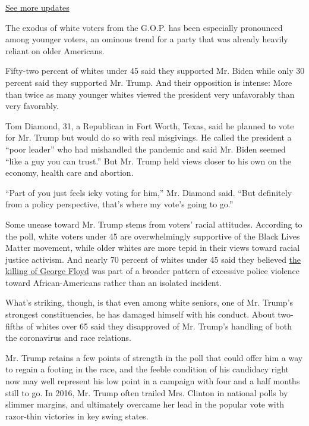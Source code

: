 \href{https://www.nytimes.com/2020/08/03/us/elections/biden-vs-trump.html?action=click\&pgtype=Article\&state=default\&region=MAIN_CONTENT_1\&context=storylines_live_updates}{See
more updates}

The exodus of white voters from the G.O.P. has been especially
pronounced among younger voters, an ominous trend for a party that was
already heavily reliant on older Americans.

Fifty-two percent of whites under 45 said they supported Mr. Biden while
only 30 percent said they supported Mr. Trump. And their opposition is
intense: More than twice as many younger whites viewed the president
very unfavorably than very favorably.

Tom Diamond, 31, a Republican in Fort Worth, Texas, said he planned to
vote for Mr. Trump but would do so with real misgivings. He called the
president a ``poor leader'' who had mishandled the pandemic and said Mr.
Biden seemed ``like a guy you can trust.'' But Mr. Trump held views
closer to his own on the economy, health care and abortion.

``Part of you just feels icky voting for him,'' Mr. Diamond said. ``But
definitely from a policy perspective, that's where my vote's going to
go.''

Some unease toward Mr. Trump stems from voters' racial attitudes.
According to the poll, white voters under 45 are overwhelmingly
supportive of the Black Lives Matter movement, while older whites are
more tepid in their views toward racial justice activism. And nearly 70
percent of whites under 45 said they believed
\href{https://www.nytimes.com/2020/05/31/us/george-floyd-investigation.html}{the
killing of George Floyd} was part of a broader pattern of excessive
police violence toward African-Americans rather than an isolated
incident.

What's striking, though, is that even among white seniors, one of Mr.
Trump's strongest constituencies, he has damaged himself with his
conduct. About two-fifths of whites over 65 said they disapproved of Mr.
Trump's handling of both the coronavirus and race relations.

Mr. Trump retains a few points of strength in the poll that could offer
him a way to regain a footing in the race, and the feeble condition of
his candidacy right now may well represent his low point in a campaign
with four and a half months still to go. In 2016, Mr. Trump often
trailed Mrs. Clinton in national polls by slimmer margins, and
ultimately overcame her lead in the popular vote with razor-thin
victories in key swing states.

